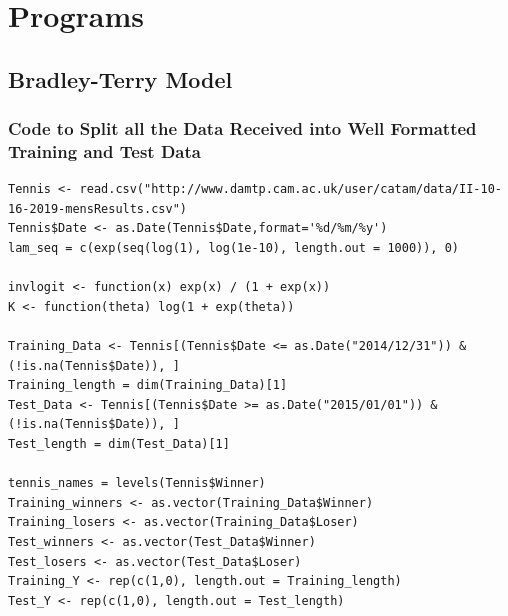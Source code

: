 \documentclass[11pt]{article} %
\begin{document}
\section*{Programs}
\subsection*{Bradley-Terry Model}
\subsubsection*{Code to Split all the Data Received into Well Formatted Training and Test Data}
\begin{lstlisting}
Tennis <- read.csv("http://www.damtp.cam.ac.uk/user/catam/data/II-10-16-2019-mensResults.csv")
Tennis$Date <- as.Date(Tennis$Date,format='%d/%m/%y')
lam_seq = c(exp(seq(log(1), log(1e-10), length.out = 1000)), 0)

invlogit <- function(x) exp(x) / (1 + exp(x))
K <- function(theta) log(1 + exp(theta))

Training_Data <- Tennis[(Tennis$Date <= as.Date("2014/12/31")) & (!is.na(Tennis$Date)), ]
Training_length = dim(Training_Data)[1]
Test_Data <- Tennis[(Tennis$Date >= as.Date("2015/01/01")) & (!is.na(Tennis$Date)), ]
Test_length = dim(Test_Data)[1]

tennis_names = levels(Tennis$Winner)
Training_winners <- as.vector(Training_Data$Winner)
Training_losers <- as.vector(Training_Data$Loser)
Test_winners <- as.vector(Test_Data$Winner)
Test_losers <- as.vector(Test_Data$Loser)
Training_Y <- rep(c(1,0), length.out = Training_length)
Test_Y <- rep(c(1,0), length.out = Test_length)
\end{lstlisting}
\end{document}
